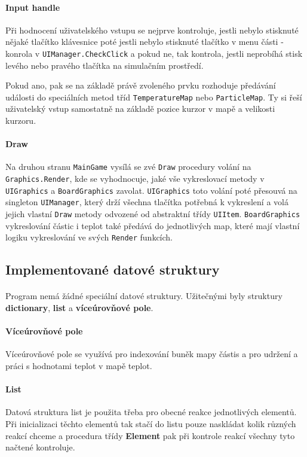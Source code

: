 \documentclass[a4paper, 12pt]{article}
\begin{document}
\paragraph{Input handle}
Při hodnocení uživatelského vstupu se nejprve kontroluje, jestli nebylo
stisknuté nějaké tlačítko klávesnice poté jestli nebylo stisknuté tlačítko v
menu části - konrola v \texttt{UIManager.CheckClick} a pokud ne, tak kontrola,
jestli neprobíhá stisk levého nebo pravého tlačítka na simulačním prostředí.

Pokud ano, pak se na základě právě zvoleného prvku rozhoduje předávání události
do speciálních metod tříd \texttt{TemperatureMap} nebo \texttt{ParticleMap}.
Ty si řeší uživatelský vstup samostatně na základě pozice kurzor v mapě a
velikosti kurzoru.

\paragraph{Draw}
Na druhou stranu \texttt{MainGame} vysílá se zvé \texttt{Draw} procedury volání
na \\\texttt{Graphics.Render}, kde se vyhodnocuje, jaké vše vykreslovací metody v
\texttt{UIGraphics} a \texttt{BoardGraphics} zavolat. \texttt{UIGraphics} toto
volání poté přesouvá na singleton \texttt{UIManager}, který drží všechna
tlačítka potřebná k vykreslení a volá jejich vlastní \texttt{Draw} metody
odvozené od abstraktní třídy \texttt{UIItem}.
\texttt{BoardGraphics} vykreslování částic i teplot také předává do
jednotlivých map, které mají vlastní logiku vykreslování ve svých
\texttt{Render} funkcích.

\newpage
\subsection{Implementované datové struktury}
\paragraph{}
Program nemá žádné speciální datové struktury. Užitečnými byly struktury
\textbf{dictionary}, \textbf{list} a \textbf{víceúrovňové pole}.

\paragraph{Víceúrovňové pole}
Víceúrovňové pole se využívá pro indexování buněk mapy částis a pro udržení a
práci s hodnotami teplot v mapě teplot.

\paragraph{List}
Datová struktura list je použita třeba pro obecné reakce jednotlivých elementů.
Při inicializaci těchto elementů tak stačí do listu pouze naskládat kolik
různých reakcí chceme a procedura třídy \textbf{Element} pak při kontrole
reakcí všechny tyto načtené kontroluje.
\end{document}
